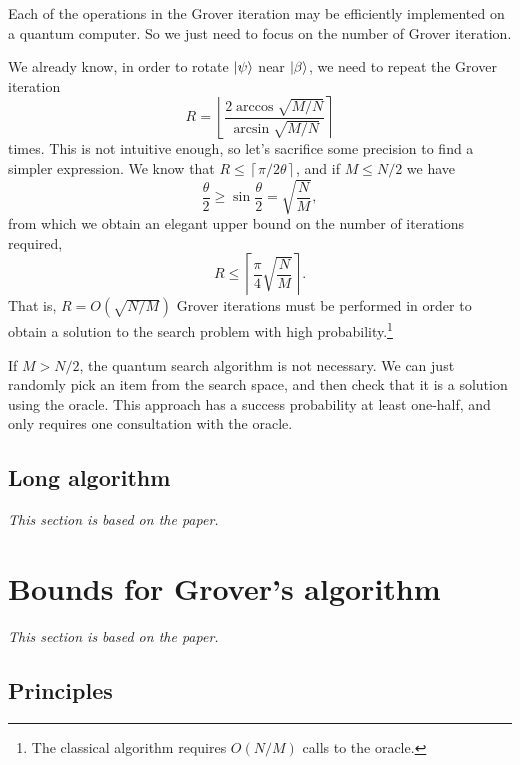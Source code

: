 \documentclass[a4paper,10pt]{article}
\numberwithin{equation}{subsection}
\begin{document}
Each of the operations in the Grover iteration may be efficiently implemented on a quantum computer. So we just need to focus on the number of Grover iteration.

We already know, in order to rotate $\ket{\psi}$ near $\ket{\beta}$, we need to repeat the Grover iteration
\begin{equation}
    R=\left\lfloor\frac{2\arccos\sqrt{M/N}}{\arcsin\sqrt{M/N}}\right\rceil
\end{equation}
times. This is not intuitive enough, so let's sacrifice some precision to find a simpler expression. We know that $R\leq\left\lceil\pi/2\theta\right\rceil$, and if $M\leq N/2$ we have
\begin{equation}
    \frac{\theta}{2}\geq\sin\frac{\theta}{2}=\sqrt{\frac{N}{M}},
\end{equation}
from which we obtain an elegant upper bound on the number of iterations required,
\begin{equation}
    R\leq\left\lceil\frac{\pi}{4}\sqrt{\frac{N}{M}}\right\rceil.
\end{equation}
That is, $R=O(\sqrt{N/M})$ Grover iterations must be performed in order to obtain a solution to the search problem with high probability.\footnote{The classical algorithm requires $O(N/M)$ calls to the oracle.}

If $M>N/2$, the quantum search algorithm is not necessary. We can just randomly pick an item from the search space, and then check that it is a solution using the oracle. This approach has a success probability at least one-half, and only requires one consultation with the oracle.



\subsection{Long algorithm}

\textit{This section is based on the paper\cite{Long_2001}.}



\section{Bounds for Grover's algorithm}

\textit{This section is based on the paper\cite{2009Exact}.}

\subsection{Principles}
\end{document}
